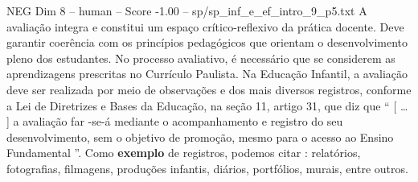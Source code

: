\begin{textsample}{NEG Dim 8 – human – Score -1.00 – sp/sp\_inf\_e\_ef\_intro\_9\_p5.txt}  \label{ex:f8_neg_012}
A avaliação integra e constitui um espaço crítico-reflexivo da prática docente.
Deve garantir coerência com os princípios pedagógicos que orientam o desenvolvimento pleno dos estudantes.
No processo avaliativo, é necessário que se considerem as aprendizagens prescritas no Currículo Paulista.
Na Educação Infantil, a avaliação deve ser realizada por meio de observações e dos mais diversos registros, conforme a Lei de Diretrizes e Bases da Educação, na seção 11, artigo 31, que diz que “ [ … ] a avaliação far -se-á mediante o acompanhamento e registro do seu desenvolvimento, sem o objetivo de promoção, mesmo para o acesso ao Ensino Fundamental ”.
Como \textbf{exemplo} de registros, podemos citar : relatórios, fotografias, filmagens, produções infantis, diários, portfólios, murais, entre outros.

\end{textsample}
